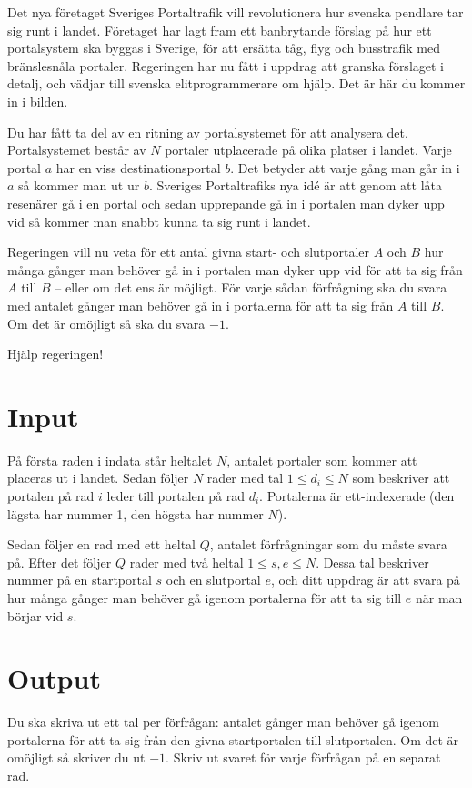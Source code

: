 
Det nya företaget Sveriges Portaltrafik vill revolutionera hur svenska
pendlare tar sig runt i landet. Företaget har lagt fram
ett banbrytande förslag på hur ett portalsystem ska byggas i Sverige, för
att ersätta tåg, flyg och busstrafik med bränslesnåla portaler. Regeringen
har nu fått i uppdrag att granska förslaget i detalj, och vädjar till
svenska elitprogrammerare om hjälp. Det är här du kommer in i bilden.

Du har fått ta del av en ritning av portalsystemet för att analysera det.
Portalsystemet består av $N$ portaler utplacerade på olika platser i landet. Varje portal $a$
har en viss destinationsportal $b$. Det betyder att varje gång man går in i $a$ så kommer man
ut ur $b$. Sveriges Portaltrafiks nya idé är att genom att låta resenärer gå
i en portal och sedan upprepande gå in i portalen man dyker upp vid så kommer man snabbt
kunna ta sig runt i landet.

Regeringen vill nu veta för ett antal givna start- och slutportaler $A$ och $B$
hur många gånger man behöver gå in i portalen man dyker upp vid för att ta sig från $A$ till
$B$ -- eller om det ens är möjligt. För varje sådan förfrågning ska du svara med antalet
gånger man behöver gå in i portalerna för att ta sig från $A$ till $B$. Om det är omöjligt
så ska du svara $-1$.

Hjälp regeringen!

\section*{Input}

På första raden i indata står heltalet $N$, antalet portaler som kommer att placeras ut i landet.
Sedan följer $N$ rader med tal $1 \le d_i \le N$ som beskriver att portalen på rad $i$ leder till portalen på
rad $d_i$. Portalerna är ett-indexerade (den lägsta har nummer 1, den högsta har nummer $N$).

Sedan följer en rad med ett heltal $Q$, antalet förfrågningar som du måste svara på. Efter det
följer $Q$ rader med två heltal $1 \le s, e \le N$. Dessa tal beskriver nummer på en startportal $s$ och en
slutportal $e$, och ditt uppdrag är att svara på hur många gånger man behöver gå igenom portalerna
för att ta sig till $e$ när man börjar vid $s$.

\section*{Output}
Du ska skriva ut ett tal per förfrågan: antalet gånger man behöver gå
igenom portalerna för att ta sig från den givna startportalen till
slutportalen. Om det är omöjligt så skriver du ut $-1$. Skriv ut svaret
för varje förfrågan på en separat rad.


